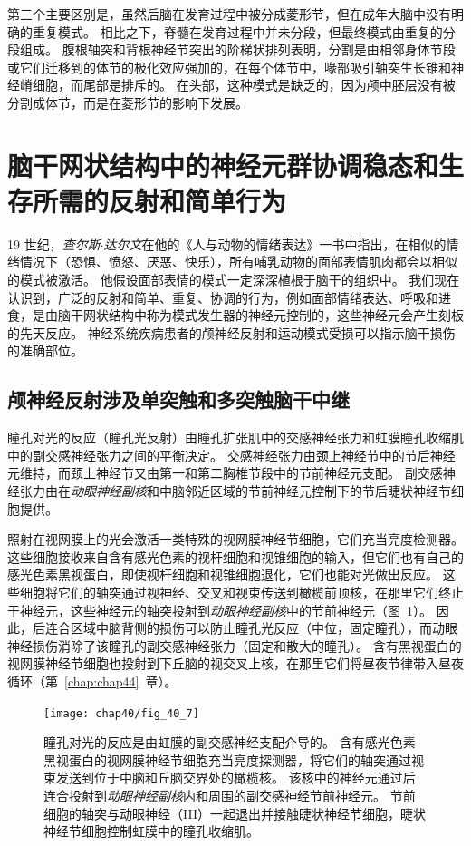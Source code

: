 第三个主要区别是，虽然后脑在发育过程中被分成菱形节，但在成年大脑中没有明确的重复模式。
相比之下，脊髓在发育过程中并未分段，但最终模式由重复的分段组成。
腹根轴突和背根神经节突出的阶梯状排列表明，分割是由相邻身体节段或它们迁移到的体节的极化效应强加的，在每个体节中，喙部吸引轴突生长锥和神经嵴细胞，而尾部是排斥的。
在头部，这种模式是缺乏的，因为颅中胚层没有被分割成体节，而是在菱形节的影响下发展。



\section{脑干网状结构中的神经元群协调稳态和生存所需的反射和简单行为}

19 世纪，\textit{查尔斯$\cdot$达尔文}在他的《人与动物的情绪表达》一书中指出，在相似的情绪情况下（恐惧、愤怒、厌恶、快乐），所有哺乳动物的面部表情肌肉都会以相似的模式被激活。
他假设面部表情的模式一定深深植根于脑干的组织中。
我们现在认识到，广泛的反射和简单、重复、协调的行为，例如面部情绪表达、呼吸和进食，是由脑干网状结构中称为模式发生器的神经元控制的，这些神经元会产生刻板的先天反应。
神经系统疾病患者的颅神经反射和运动模式受损可以指示脑干损伤的准确部位。



\subsection{颅神经反射涉及单突触和多突触脑干中继}

瞳孔对光的反应（瞳孔光反射）由瞳孔扩张肌中的交感神经张力和虹膜瞳孔收缩肌中的副交感神经张力之间的平衡决定。
交感神经张力由颈上神经节中的节后神经元维持，而颈上神经节又由第一和第二胸椎节段中的节前神经元支配。
副交感神经张力由在\textit{动眼神经副核}和中脑邻近区域的节前神经元控制下的节后睫状神经节细胞提供。


照射在视网膜上的光会激活一类特殊的视网膜神经节细胞，它们充当亮度检测器。
这些细胞接收来自含有感光色素的视杆细胞和视锥细胞的输入，但它们也有自己的感光色素黑视蛋白，即使视杆细胞和视锥细胞退化，它们也能对光做出反应。
这些细胞将它们的轴突通过视神经、交叉和视束传送到橄榄前顶核，在那里它们终止于神经元，这些神经元的轴突投射到\textit{动眼神经副核}中的节前神经元（图~\ref{fig:40_7}）。
因此，后连合区域中脑背侧的损伤可以防止瞳孔光反应（中位，固定瞳孔），而动眼神经损伤消除了该瞳孔的副交感神经张力（固定和散大的瞳孔）。
含有黑视蛋白的视网膜神经节细胞也投射到下丘脑的视交叉上核，在那里它们将昼夜节律带入昼夜循环（第~\ref{chap:chap44}~章）。


\begin{figure}[htbp]
	\centering
	\texttt{[image: chap40/fig\_40\_7]}
	\caption{瞳孔对光的反应是由虹膜的副交感神经支配介导的。
		含有感光色素黑视蛋白的视网膜神经节细胞充当亮度探测器，将它们的轴突通过视束发送到位于中脑和丘脑交界处的橄榄核。
		该核中的神经元通过后连合投射到\textit{动眼神经副核}内和周围的副交感神经节前神经元。
		节前细胞的轴突与动眼神经（III）一起退出并接触睫状神经节细胞，睫状神经节细胞控制虹膜中的瞳孔收缩肌。}
	\label{fig:40_7}
\end{figure}


